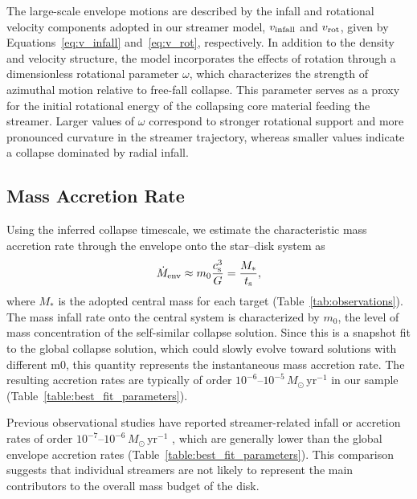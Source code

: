 The large-scale envelope motions are described by the infall and rotational velocity components adopted in our streamer model, $v_{\rm infall}$ and $v_{\rm rot}$, given by Equations~\ref{eq:v_infall} and~\ref{eq:v_rot}, respectively. In addition to the density and velocity structure, the model incorporates the effects of rotation through a dimensionless rotational parameter $\omega$, which characterizes the strength of azimuthal motion relative to free-fall collapse. This parameter serves as a proxy for the initial rotational energy of the collapsing core material feeding the streamer. Larger values of $\omega$ correspond to stronger rotational support and more pronounced curvature in the streamer trajectory, whereas smaller values indicate a collapse dominated by radial infall. 

\subsection{Mass Accretion Rate}\label{sec:Mass_Accretion_Rate_and_Rotational_Energy}

Using the inferred collapse timescale, we estimate the characteristic mass accretion rate through the envelope onto the star--disk system as 
\begin{align}
    \dot{M}_{\rm env} \approx m_0\frac{c_{\rm s}^3}{G} = \frac{M_*}{t_{\rm s}}, 
\end{align}
where $M_*$ is the adopted central mass for each target (Table~\ref{tab:observations}). The mass infall rate onto the central system is characterized by $m_0$, the level of mass concentration of the self-similar collapse solution. Since this is a snapshot fit to the global collapse solution, which could slowly evolve toward solutions with different m0, this quantity represents the instantaneous mass accretion rate. The resulting accretion rates are typically of order $10^{-6}$--$10^{-5}\,M_\odot\,\mathrm{yr^{-1}}$ in our sample (Table~\ref{table:best_fit_parameters}).

Previous observational studies have reported streamer-related infall or accretion rates of order $10^{-7}$--$10^{-6}\,M_\odot\,\mathrm{yr^{-1}}$ \citep[e.g.,][]{Pineda_2020,Valdivia-Mena_2022,Gahm_2018,Gupta_2024}, which are generally lower than the global envelope accretion rates (Table~\ref{table:best_fit_parameters}). This comparison suggests that individual streamers are not likely to represent the main contributors to the overall mass budget of the disk.



